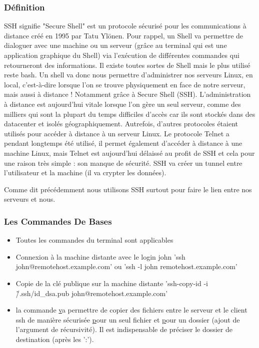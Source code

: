 \subsubsection{Définition}

SSH signifie "Secure Shell" est un protocole sécurisé pour les communications à distance créé en 1995 par Tatu Ylönen.
Pour rappel, un Shell va permettre de dialoguer avec une machine ou un serveur (grâce au terminal qui est une application graphique
 du Shell) via l'exécution de différentes commandes qui retourneront des informations. Il existe toutes sortes de Shell
 mais le plus utilisé reste bash.
Un shell va donc nous permettre d'administrer nos serveurs Linux, en local, c'est-à-dire lorsque l'on se trouve physiquement
 en face de notre serveur, mais aussi à distance ! Notamment grâce à Secure Shell (SSH).
L'administration à distance est aujourd'hui vitale lorsque l'on gère un seul serveur, comme des milliers qui sont
la plupart du temps difficiles d'accès car ils sont stockés dans des datacenter et isolés géographiquement.
Autrefois, d'autres protocoles étaient utilisés pour accéder à distance à un serveur Linux. Le protocole Telnet a
pendant longtemps été utilisé, il permet également d'accéder à distance à une machine Linux, mais Telnet est aujourd'hui
délaissé au profit de SSH et cela pour une raison très simple : son manque de sécurité. SSH va créer un tunnel entre l'utilisateur
et la machine (il va crypter les données).

Comme dit précédemment nous utilisons SSH surtout pour faire le lien entre nos serveurs et nous.

\subsubsection{Les Commandes De Bases}
\begin{itemize}
	\item Toutes les commandes du terminal sont applicables
	\item Connexion à la machine distante avec le login john 'ssh john@remotehost.example.com' ou 'ssh -l john remotehost.example.com'
	\item Copie de la clé publique sur la machine distante 'ssh-copy-id -i \~/.ssh/id\_dsa.pub john@remotehost.example.com'
	\item la commande \href{scp} va permettre de copier des fichiers entre le serveur et le client ssh de manière sécurisée \href{scp my\_file john@remotehost.example.com:/home/john/a\_folder}
	pour un seul fichier et \href{scp -r my\_folder john@remotehost.example.com:/home/john/another\_folder} pour un dossier
	(ajout de l’argument de récursivité). Il est indispensable de préciser le dossier de destination (après les ':').
\end{itemize}
